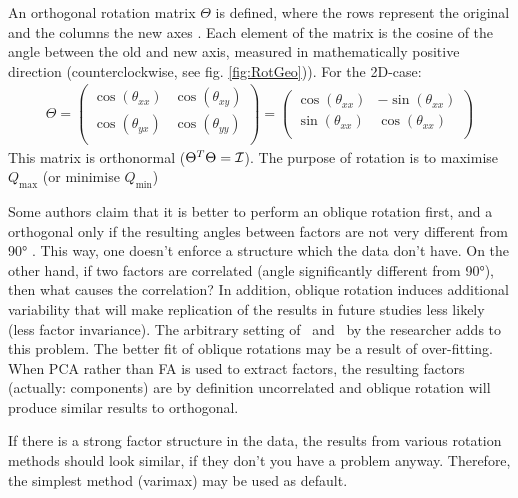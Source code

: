 An orthogonal rotation matrix \(\Theta \) is defined, where the rows represent the original and the columns the new  axes \parencite{Abd-03}. Each element of the matrix is the cosine of the angle between the old and new axis, measured in mathematically positive direction (counterclockwise, see fig. \ref{fig:RotGeo})). For the 2D-case:
\begin{gather}
   \Theta = \begin{pmatrix}
                \cos(\theta_{xx}) & \cos(\theta_{xy}) \\
                \cos(\theta_{yx}) & \cos(\theta_{yy}) \\
            \end{pmatrix}
          = \begin{pmatrix}
                \cos(\theta_{xx}) & -\sin(\theta_{xx}) \\
                \sin(\theta_{xx}) &  \cos(\theta_{xx}) \\
            \end{pmatrix}
\end{gather}
This matrix is orthonormal (\( \Theta^T\Theta = \mathcal{I} \)). The purpose of rotation is to maximise \(Q_\mathrm{max} \) (or minimise \(Q_\mathrm{min} \))

Some authors claim that it is better to perform an oblique rotation first, and a orthogonal only if the resulting angles between factors are not very different from \ang{90} \parencite{Cos-05}. This way, one doesn't enforce a structure which the data don't have. On the other hand, if two factors are correlated (angle significantly different from \ang{90}), then what causes the correlation? In addition, oblique rotation induces additional variability that will make replication of the results in future studies less likely (less factor invariance). The arbitrary setting of \textkappa\ and \textdelta\ by the researcher adds to this problem. The better fit of oblique rotations may be a result of over-fitting. When \acs{PCA} rather than \acs{FA} is used to extract factors, the resulting factors (actually: components) are by definition uncorrelated and oblique rotation will produce similar results to orthogonal.

If there is a strong factor structure in the data, the results from various rotation methods should look similar, if they don't you have a problem anyway. Therefore, the simplest method (varimax) may be used as default.

